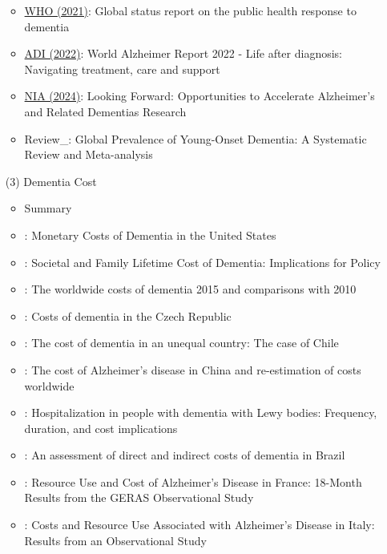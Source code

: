 \documentclass[12pt]{article}
\begin{document}
\begin{itemize}
\begin{itemize}
        \item \href{https://www.who.int/publications/i/item/9789240033245}{WHO (2021)}: Global status report on the public health response to dementia
        \item \href{https://www.alzint.org/what-we-do/research/world-alzheimer-report/}{ADI (2022)}: World Alzheimer Report 2022 - Life after diagnosis: Navigating treatment, care and support
        \item \href{https://www.nia.nih.gov/research/blog/2022/07/looking-forward-nihs-alzheimers-disease-and-related-dementias-fy-2024-bypass}{NIA (2024)}: Looking Forward: Opportunities to Accelerate Alzheimer’s and Related Dementias Research 
        \item Review\_\cite{hendriks2021global}: Global Prevalence of Young-Onset Dementia: A Systematic Review and Meta-analysis
    \end{itemize}
    \item[(3)] Dementia Cost
    \begin{itemize}
        \item Summary
        \item \cite{hurd2013monetary}: Monetary Costs of Dementia in the United States
        \item \cite{jutkowitz2017societal}: Societal and Family Lifetime Cost of Dementia: Implications for Policy
        \item \cite{wimo2017worldwide}: The worldwide costs of dementia 2015 and comparisons with 2010
        \item \cite{holmerova2017costs}: Costs of dementia in the Czech Republic
        \item \cite{hojman2017cost}: The cost of dementia in an unequal country: The case of Chile
        \item \cite{jia2018cost}: The cost of Alzheimer’s disease in China and re-estimation of costs worldwide
        \item \cite{mueller2018hospitalization}: Hospitalization in people with dementia with Lewy bodies: Frequency, duration, and cost implications
        \item \cite{ferretti2018assessment}: An assessment of direct and indirect costs of dementia in Brazil
        \item \cite{rapp2018resource}: Resource Use and Cost of Alzheimer’s Disease in France: 18-Month Results from the GERAS Observational Study
        \item \cite{bruno2018costs}: Costs and Resource Use Associated with Alzheimer’s Disease in Italy: Results from an Observational Study

\end{itemize}
\end{itemize}
\end{document}

